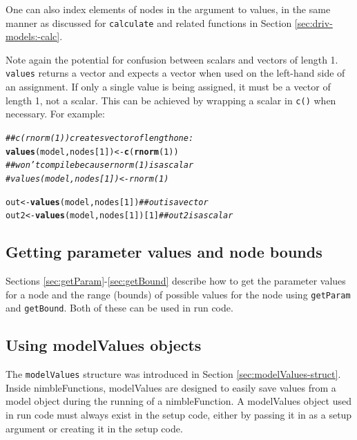 \documentclass[12pt,oneside]{book}\usepackage[]{graphicx}\usepackage[]{color}
\makeatletter
\newcommand{\hlnum}[1]{\textcolor[rgb]{0.686,0.059,0.569}{#1}}%
\newcommand{\hlcom}[1]{\textcolor[rgb]{0.678,0.584,0.686}{\textit{#1}}}%
\newcommand{\hlstd}[1]{\textcolor[rgb]{0.345,0.345,0.345}{#1}}%
\newcommand{\hlkwb}[1]{\textcolor[rgb]{0.69,0.353,0.396}{#1}}%
\newcommand{\hlkwd}[1]{\textcolor[rgb]{0.737,0.353,0.396}{\textbf{#1}}}%
\newenvironment{kframe}{%
 \def\at@end@of@kframe{}%
 \ifinner\ifhmode%
  \def\at@end@of@kframe{\end{minipage}}%
  \begin{minipage}{\columnwidth}%
 \fi\fi%
 \def\FrameCommand##1{\hskip\@totalleftmargin \hskip-\fboxsep
 \colorbox{shadecolor}{##1}\hskip-\fboxsep
     \hskip-\linewidth \hskip-\@totalleftmargin \hskip\columnwidth}%
 \MakeFramed {\advance\hsize-\width
   \@totalleftmargin\z@ \linewidth\hsize
   \@setminipage}}%
 {\par\unskip\endMakeFramed%
 \at@end@of@kframe}
\newenvironment{knitrout}{}{} %
\def\cd#1{\texttt{#1}}
\makeatother
\begin{document}
One can also index elements of nodes in the argument to values, in the same manner as discussed for \cd{calculate} and related functions in Section \ref{sec:driv-models:-calc}.

Note again the potential for confusion between scalars and vectors of
length 1. \cd{values} returns a vector and expects a vector when used
on the left-hand side of an assignment.  If only a single value is
being assigned, it must be a vector of length 1, not a scalar.  This
can be achieved by wrapping a scalar in \cd{c()} when necessary.
For example:

\begin{knitrout}
\color{fgcolor}\begin{kframe}
\begin{alltt}
\hlcom{## c(rnorm(1)) creates vector of length one:}
\hlkwd{values}\hlstd{(model, nodes[}\hlnum{1}\hlstd{])} \hlkwb{<-} \hlkwd{c}\hlstd{(}\hlkwd{rnorm}\hlstd{(}\hlnum{1}\hlstd{))}
\hlcom{## won't compile because rnorm(1) is a scalar}
\hlcom{# values(model, nodes[1]) <- rnorm(1)  }

\hlstd{out} \hlkwb{<-} \hlkwd{values}\hlstd{(model, nodes[}\hlnum{1}\hlstd{])} \hlcom{## out is a vector}
\hlstd{out2} \hlkwb{<-} \hlkwd{values}\hlstd{(model, nodes[}\hlnum{1}\hlstd{])[}\hlnum{1}\hlstd{]} \hlcom{## out2 is a scalar}
\end{alltt}
\end{kframe}
\end{knitrout}


\subsection{Getting parameter values and node bounds}

Sections \ref{sec:getParam}-\ref{sec:getBound} describe how to get the parameter values for a node and the range (bounds) of possible values for the node using  \cd{getParam} and \cd{getBound}. Both of these can be used in run code. 

\subsection{Using modelValues objects}
\label{sec:access-model-modelv}


The \cd{modelValues} structure was introduced in Section
\ref{sec:modelValues-struct}.  Inside nimbleFunctions, modelValues are
designed to easily save values from a model object during the running
of a nimbleFunction. A modelValues object used in run code
must always exist in the setup code, either by passing it in as a
setup argument or creating it in the setup code.
  
\end{document}
